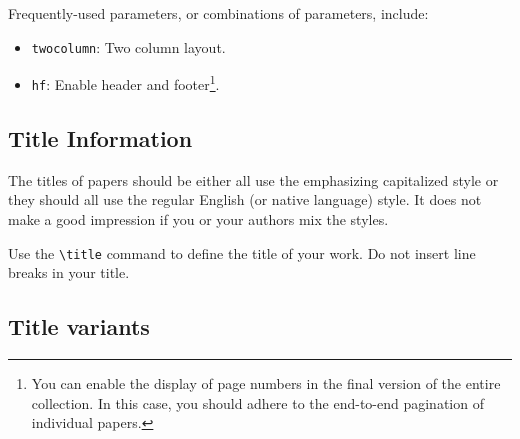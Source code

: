 \documentclass[
]{ceurart}
\begin{document}
Frequently-used parameters, or combinations of parameters, include:
\begin{itemize}
\item {\verb|twocolumn|}: Two column layout.
\item {\verb|hf|}: Enable header and footer\footnote{You can enable
    the display of page numbers in the final version of the entire
    collection. In this case, you should adhere to the end-to-end
    pagination of individual papers.}.
\end{itemize}


\subsection{Title Information}

The titles of papers should be either all use the emphasizing
capitalized style or they should all use the regular English (or
native language) style. It does not make a good impression if you or
your authors mix the styles.

Use the \verb|\title| command to define the title of your work. Do not
insert line breaks in your title.

\subsection{Title variants}



\end{document}
